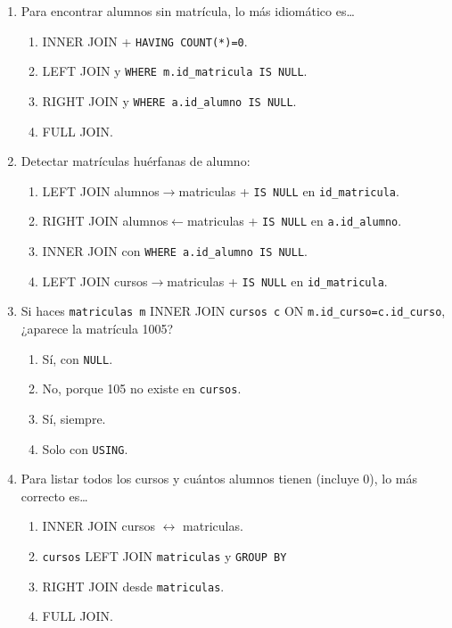 \documentclass[11pt,a4paper]{article}
\begin{document}
\begin{enumerate}[label=\textbf{\arabic*.}]
\item Para encontrar alumnos sin matrícula, lo más idiomático es…
  \begin{enumerate}[label=\Alph*.]
    \item INNER JOIN + \texttt{HAVING COUNT(*)=0}.
    \item LEFT JOIN y \texttt{WHERE m.id\_matricula IS NULL}.
    \item RIGHT JOIN y \texttt{WHERE a.id\_alumno IS NULL}.
    \item FULL JOIN.
  \end{enumerate}

\item Detectar matrículas huérfanas de alumno:
  \begin{enumerate}[label=\Alph*.]
    \item LEFT JOIN alumnos$\to$matriculas + \texttt{IS NULL} en \texttt{id\_matricula}.
    \item RIGHT JOIN alumnos$\leftarrow$matriculas + \texttt{IS NULL} en \texttt{a.id\_alumno}.
    \item INNER JOIN con \texttt{WHERE a.id\_alumno IS NULL}.
    \item LEFT JOIN cursos$\to$matriculas + \texttt{IS NULL} en \texttt{id\_matricula}.
  \end{enumerate}

\item Si haces \texttt{matriculas m} INNER JOIN \texttt{cursos c} ON \texttt{m.id\_curso=c.id\_curso}, ¿aparece la matrícula 1005?
  \begin{enumerate}[label=\Alph*.]
    \item Sí, con \texttt{NULL}.
    \item No, porque 105 no existe en \texttt{cursos}.
    \item Sí, siempre.
    \item Solo con \texttt{USING}.
  \end{enumerate}

\item Para listar todos los cursos y cuántos alumnos tienen (incluye 0), lo más correcto es…
  \begin{enumerate}[label=\Alph*.]
    \item INNER JOIN cursos $\leftrightarrow$ matriculas.
    \item \texttt{cursos} LEFT JOIN  \texttt{matriculas} y \texttt{GROUP BY}
    \item RIGHT JOIN desde \texttt{matriculas}.
    \item FULL JOIN.
  \end{enumerate}


\end{enumerate}
\end{document}
